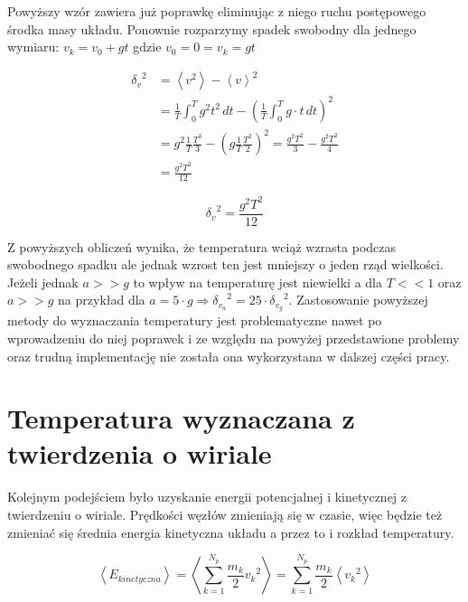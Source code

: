 \documentclass[12pt, letterpaper]{report}
\begin{document}
    Powyższy wzór zawiera już poprawkę eliminując z niego ruchu postępowego środka masy układu.
    Ponownie rozparzymy spadek swobodny dla jednego wymiaru: $v_k = v_0 + gt$ gdzie $v_0 = 0 = v_k = gt$

    \begin{align*}
        {\delta_v}^2  &=
        \left< v^2 \right> - \left< v \right>^2 \\ 
        &=  \frac{1}{T} \int_{0}^{T} g^2 t^2 \, dt  -  \left( \frac{1}{T} \int_{0}^{T} g \cdot t \, dt \right)^2  \\
        &=  g^2 \frac{1}{T} \frac{T^3}{3}  -  \left( g \frac{1}{T} \frac{T^2}{2} \right)^2  = \frac{g^2 T^2}{3}  -  \frac{g^2 T^2}{4} \\
        &=  \frac{g^2 T^2}{12}
    \end{align*}

    \begin{equation}
        {\delta_v}^2  =  \frac{g^2 T^2}{12}
    \end{equation}

    Z powyższych obliczeń wynika, że temperatura wciąż wzrasta podczas swobodnego spadku
    ale jednak wzrost ten jest mniejszy o jeden rząd wielkości. 
    Jeżeli jednak $a >> g$ to wpływ na temperaturę jest niewielki a dla $T << 1$ oraz $a >> g$ 
    na przykład dla $a = 5 \cdot g \Rightarrow {\delta_{v_a}}^2 = 25 \cdot {\delta_{v_g}}^2$.
    Zastosowanie powyższej metody do wyznaczania temperatury jest problematyczne nawet po wprowadzeniu do niej poprawek i
    ze względu na powyżej przedstawione problemy oraz trudną implementację nie została ona 
    wykorzystana w dalszej części pracy. 

    \clearpage
    \section{Temperatura wyznaczana z twierdzenia o wiriale}
    Kolejnym podejściem było uzyskanie energii potencjalnej i kinetycznej z twierdzeniu o wiriale.
    Prędkości węzłów zmieniają się w czasie, więc będzie też zmieniać się średnia energia kinetyczna układu
    a przez to i rozkład temperatury.

    \begin{equation}
        \left< E_{kinetyczna} \right>  =  \left< \sum_{k = 1}^{N_p} \frac{m_k}{2} {v_k}^2 \right>
        = \sum_{k = 1}^{N_p} \frac{m_k}{2} \left< {v_k}^2 \right>
    \end{equation}
\end{document}
